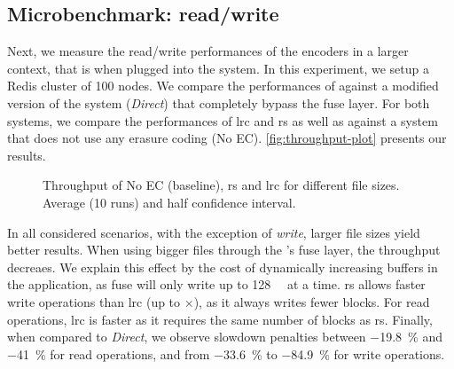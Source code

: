 \begin{table}
    \centering
    \caption{Encoding throughput of the different encoiders in \si{\mega\byte\per\second}}
    
    \label{table:codes-performance-table}
\end{table}

\subsection{Microbenchmark: read/write}
Next, we measure the read/write performances of the encoders in a larger context, that is when plugged into the \SYS system.
In this experiment, we setup a Redis cluster of 100 nodes.
We compare the performances of \SYS against a modified version of the system (\textit{Direct}) that completely bypass the \ac{fuse} layer.
For both systems, we compare the performances of \ac{lrc} and \ac{rs} as well as against a system that does not use any erasure coding (No EC).  
\autoref{fig:throughput-plot} presents our results.

\begin{figure*}[t]
    \centering
    
    \caption{Throughput of No EC (baseline), \ac{rs} and \ac{lrc} for different file sizes. Average (10 runs) and half confidence interval.}
    \label{fig:throughput-plot}
\end{figure*}

In all considered scenarios, with the exception of \SYS \textit{write}, larger file sizes yield better results.
When using bigger files through the \SYS's \ac{fuse} layer, the throughput decreaes.
We explain this effect by the cost of dynamically increasing buffers in the application, as \ac{fuse} will only write up to \SI{128}{\kibi\byte} at a time.
\ac{rs} allows faster write operations than \ac{lrc} (up to $\times$), as it always writes fewer blocks.
For read operations, \ac{lrc} is faster as it requires the same number of blocks as \ac{rs}.
Finally, when compared to \textit{Direct}, we observe slowdown penalties between \SI{-19.8}{\percent} and \SI{-41}{\percent} for read operations, and from \SI{-33.6}{\percent} to \SI{-84.9}{\percent} for write operations.



